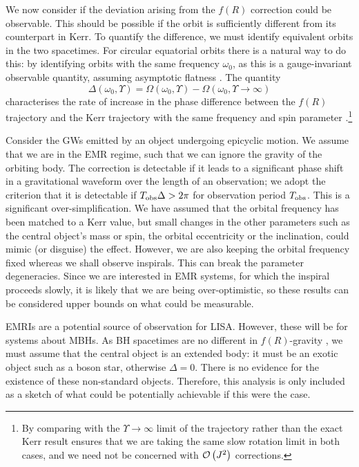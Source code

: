 We now consider if the deviation arising from the $f(R)$ correction could be observable. This should be possible if the orbit is sufficiently different from its counterpart in Kerr. To quantify the difference, we must identify equivalent orbits in the two spacetimes. For circular equatorial orbits there is a natural way to do this: by identifying orbits with the same frequency $\omega_0$, as this is a gauge-invariant observable quantity, assuming asymptotic flatness \citep{Detweiler2008}. The quantity
\begin{equation}
\Delta(\omega_0,\Upsilon) = \Omega(\omega_0,\Upsilon) - \Omega(\omega_0,\Upsilon \rightarrow \infty)
\end{equation}
characterises the rate of increase in the phase difference between the $f(R)$ trajectory and the Kerr trajectory with the same frequency and spin parameter \citep{Berry2011}.\footnote{By comparing with the $\Upsilon \rightarrow\infty$ limit of the trajectory rather than the exact Kerr result ensures that we are taking the same slow rotation limit in both cases, and we need not be concerned with $\mathcal{O}\left({J^2}\right)$ corrections.}

Consider the GWs emitted by an object undergoing epicyclic motion. We assume that we are in the EMR regime, such that we can ignore the gravity of the orbiting body. The correction is detectable if it leads to a significant phase shift in a gravitational waveform over the length of an observation; we adopt the criterion that it is detectable if $T_\mathrm{obs}\Delta > 2\pi$ for observation period $T_\mathrm{obs}$. This is a significant over-simplification. We have assumed that the orbital frequency has been matched to a Kerr value, but small changes in the other parameters such as the central object's mass or spin, the orbital eccentricity or the inclination, could mimic (or disguise) the effect. However, we are also keeping the orbital frequency fixed whereas we shall observe inspirals. This can break the parameter degeneracies. Since we are interested in EMR systems, for which the inspiral proceeds slowly, it is likely that we are being over-optimistic, so these results can be considered upper bounds on what could be measurable.

EMRIs are a potential source of observation for LISA. However, these will be for systems about MBHs. As BH spacetimes are no different in $f(R)$-gravity \citep{Psaltis2008, Sotiriou2011}, we must assume that the central object is an extended body: it must be an exotic object such as a boson star, otherwise $\Delta = 0$. There is no evidence for the existence of these non-standard objects. Therefore, this analysis is only included as a sketch of what could be potentially achievable if this were the case.

